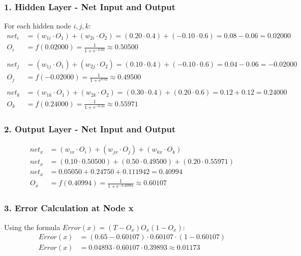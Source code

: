 \documentclass{article}
\begin{document}
\subsubsection*{1. Hidden Layer - Net Input and Output}
For each hidden node $i, j, k$:
\begin{align*}
    net_i &= (w_{1i} \cdot O_1) + (w_{2i} \cdot O_2) = (0.20 \cdot 0.4) + (-0.10 \cdot 0.6) = 0.08 - 0.06 = 0.02000 \\
    O_i &= f(0.02000) = \frac{1}{1 + e^{-0.02}} \approx 0.50500 \\
    \\
    net_j &= (w_{1j} \cdot O_1) + (w_{2j} \cdot O_2) = (0.10 \cdot 0.4) + (-0.10 \cdot 0.6) = 0.04 - 0.06 = -0.02000 \\
    O_j &= f(-0.02000) = \frac{1}{1 + e^{0.02}} \approx 0.49500 \\
    \\
    net_k &= (w_{1k} \cdot O_1) + (w_{2k} \cdot O_2) = (0.30 \cdot 0.4) + (0.20 \cdot 0.6) = 0.12 + 0.12 = 0.24000 \\
    O_k &= f(0.24000) = \frac{1}{1 + e^{-0.24}} \approx 0.55971
\end{align*}

\subsubsection*{2. Output Layer - Net Input and Output}
\begin{align*}
    net_x &= (w_{ix} \cdot O_i) + (w_{jx} \cdot O_j) + (w_{kx} \cdot O_k) \\
    net_x &= (0.10 \cdot 0.50500) + (0.50 \cdot 0.49500) + (0.20 \cdot 0.55971) \\
    net_x &= 0.05050 + 0.24750 + 0.111942 = 0.40994 \\
    O_x &= f(0.40994) = \frac{1}{1 + e^{-0.40994}} \approx 0.60107
\end{align*}

\subsubsection*{3. Error Calculation at Node x}
Using the formula $Error(x) = (T - O_x) O_x (1 - O_x)$:
\begin{align*}
    Error(x) &= (0.65 - 0.60107) \cdot 0.60107 \cdot (1 - 0.60107) \\
    Error(x) &= 0.04893 \cdot 0.60107 \cdot 0.39893 \approx 0.01173
\end{align*}
\end{document}
